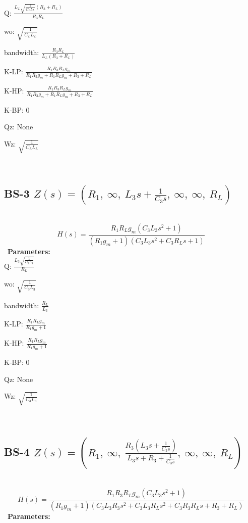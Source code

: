 \documentclass{article}
\begin{document}
Q: $\frac{L_{L} \sqrt{\frac{1}{C_{L} L_{L}}} \left(R_{3} + R_{L}\right)}{R_{3} R_{L}}$\ 

wo: $\sqrt{\frac{1}{C_{L} L_{L}}}$\ 

bandwidth: $\frac{R_{3} R_{L}}{L_{L} \left(R_{3} + R_{L}\right)}$\ 

K-LP: $\frac{R_{1} R_{3} R_{L} g_{m}}{R_{1} R_{3} g_{m} + R_{1} R_{L} g_{m} + R_{3} + R_{L}}$\ 

K-HP: $\frac{R_{1} R_{3} R_{L} g_{m}}{R_{1} R_{3} g_{m} + R_{1} R_{L} g_{m} + R_{3} + R_{L}}$\ 

K-BP: $0$\ 

Qz: $\text{None}$\ 

Wz: $\sqrt{\frac{1}{C_{L} L_{L}}}$\ 

\ 

\subsection{BS-3 $Z(s) = \left( R_{1}, \  \infty, \  L_{3} s + \frac{1}{C_{3} s}, \  \infty, \  \infty, \  R_{L}\right)$ } \ 
\textbf{\[H(s) = \frac{R_{1} R_{L} g_{m} \left(C_{3} L_{3} s^{2} + 1\right)}{\left(R_{1} g_{m} + 1\right) \left(C_{3} L_{3} s^{2} + C_{3} R_{L} s + 1\right)}\] } \ 
\textbf{Parameters:}\\ 

Q: $\frac{L_{3} \sqrt{\frac{1}{C_{3} L_{3}}}}{R_{L}}$\ 

wo: $\sqrt{\frac{1}{C_{3} L_{3}}}$\ 

bandwidth: $\frac{R_{L}}{L_{3}}$\ 

K-LP: $\frac{R_{1} R_{L} g_{m}}{R_{1} g_{m} + 1}$\ 

K-HP: $\frac{R_{1} R_{L} g_{m}}{R_{1} g_{m} + 1}$\ 

K-BP: $0$\ 

Qz: $\text{None}$\ 

Wz: $\sqrt{\frac{1}{C_{3} L_{3}}}$\ 

\ 

\subsection{BS-4 $Z(s) = \left( R_{1}, \  \infty, \  \frac{R_{3} \left(L_{3} s + \frac{1}{C_{3} s}\right)}{L_{3} s + R_{3} + \frac{1}{C_{3} s}}, \  \infty, \  \infty, \  R_{L}\right)$ } \ 
\textbf{\[H(s) = \frac{R_{1} R_{3} R_{L} g_{m} \left(C_{3} L_{3} s^{2} + 1\right)}{\left(R_{1} g_{m} + 1\right) \left(C_{3} L_{3} R_{3} s^{2} + C_{3} L_{3} R_{L} s^{2} + C_{3} R_{3} R_{L} s + R_{3} + R_{L}\right)}\] } \ 
\textbf{Parameters:}\\ 
\end{document}

